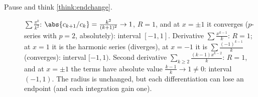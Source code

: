\documentclass[11pt]{article}
\begin{document}
\begin{description}
  \item[Pause and think \ref{think:endchange}.] $\sum\frac{x^k}{k^2}$: $\abs{c_{k+1}/c_k}=\frac{k^2}{(k+1)^2}\to1$, $R=1$, and at $x=\pm1$ it converges ($p$-series with $p=2$, absolutely): interval $[-1,1]$. Derivative $\sum\frac{x^{k-1}}k$: $R=1$; at $x=1$ it is the harmonic series (diverges), at $x=-1$ it is $\sum\frac{(-1)^{k-1}}k$ (converges): interval $[-1,1)$. Second derivative $\sum_{k\ge2}\frac{(k-1)x^{k-2}}k$: $R=1$, and at $x=\pm1$ the terms have absolute value $\frac{k-1}k\to1\ne0$: interval $(-1,1)$. The radius is unchanged, but each differentiation can lose an endpoint (and each integration gain one).
\end{description}
\end{document}
